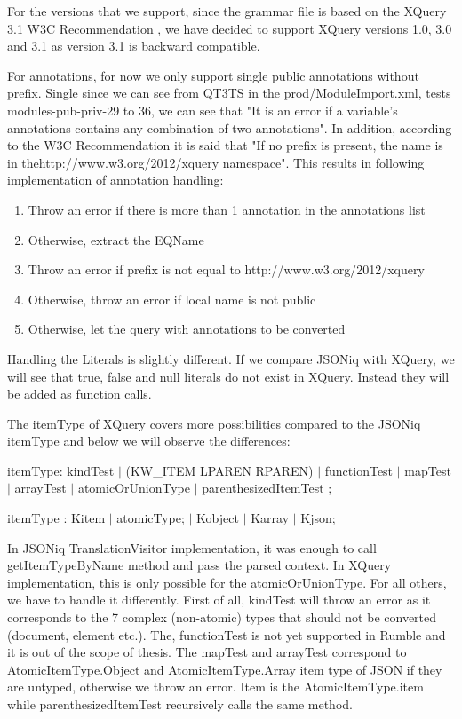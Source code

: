 For the versions that we support, since the grammar file is based on the XQuery 3.1 W3C Recommendation \cite{XQueryRecommendation}, we have decided to support XQuery versions 1.0, 3.0 and 3.1 as version  3.1 is backward compatible.

For annotations, for now we only support single public annotations without prefix. Single since we can see from QT3TS in the prod/ModuleImport.xml, tests modules-pub-priv-29 to 36, we can see that "It is an error if a variable's annotations contains any combination of two annotations". In addition, according to the W3C Recommendation \cite{XQueryRecommendation} it is said that "If no prefix is present, the name is in thehttp://www.w3.org/2012/xquery namespace". This results in following implementation of annotation handling:
\begin{enumerate}
	\item Throw an error if there is more than 1 annotation in the annotations list
	\item Otherwise, extract the EQName
	\item Throw an error if prefix is not equal to http://www.w3.org/2012/xquery 
	\item Otherwise, throw an error if local name is not public
	\item Otherwise, let the query with annotations to be converted
\end{enumerate}

Handling the Literals is slightly different. If we compare JSONiq with XQuery, we will see that true, false and null literals do not exist in XQuery. Instead they will be added as function calls.

The itemType of XQuery covers more possibilities compared to the JSONiq itemType and below we will observe the differences:

itemType: kindTest
$|$ (KW\_ITEM LPAREN RPAREN)
$|$ functionTest
$|$ mapTest
$|$ arrayTest
$|$ atomicOrUnionType
$|$ parenthesizedItemTest ;

itemType                : Kitem
$|$ atomicType;
$|$ Kobject
$|$ Karray
$|$ Kjson;

In JSONiq TranslationVisitor implementation, it was enough to call getItemTypeByName method and pass the parsed context. In XQuery implementation, this is only possible for the atomicOrUnionType. For all others, we have to handle it differently. First of all, kindTest will throw an error as it corresponds to the 7 complex (non-atomic) types that should not be converted (document, element etc.). The, functionTest is not yet supported in Rumble and it is out of the scope of thesis. The mapTest and arrayTest correspond to AtomicItemType.Object and AtomicItemType.Array item type of JSON if they are untyped, otherwise we throw an error. Item is the AtomicItemType.item while parenthesizedItemTest recursively calls the same method.

